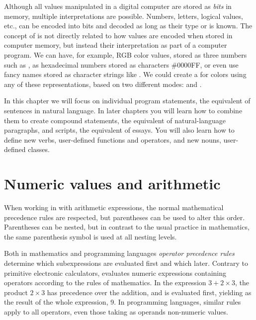\documentclass[krantz2]{krantz}\usepackage{knitr}
\begin{document}
Although all values manipulated in a digital computer are stored as \textit{bits} in memory, multiple interpretations are possible. Numbers, letters, logical values, etc., can be encoded into bits and decoded as long as their type or  is known. The concept of  is not directly related to how values are encoded when stored in computer memory, but instead their interpretation as part of a computer program. We can have, for example, RGB color values, stored as three numbers such as , as hexadecimal numbers stored as characters {\#0000FF}, or even use fancy names stored as character strings like . We could create a  for colors using any of these representations, based on two different modes:  and .

In this chapter we will focus on individual program statements, the equivalent of sentences in natural language. In later chapters you will learn how to combine them to create compound statements, the equivalent of natural-language paragraphs, and scripts, the equivalent of essays. You will also learn how to define new verbs, user-defined functions and operators, and new nouns, user-defined classes.

\section{Numeric values and arithmetic}
\qRoperator{+}\qRoperator{-}\qRoperator{*}\qRoperator{/}
When working in \Rlang with arithmetic expressions, the normal mathematical precedence rules are respected, but parentheses can be used to alter this order. Parentheses can be nested, but in contrast to the usual practice in mathematics, the same parenthesis symbol is used at all nesting levels.

\begin{explainbox}
 Both in mathematics and programming languages \emph{operator precedence rules} determine which subexpressions are evaluated first and which later. Contrary to primitive electronic calculators, \Rlang evaluates numeric expressions containing operators according to the rules of mathematics. In the expression $3 + 2 \times 3$, the product $2 \times 3$ has precedence over the addition, and is evaluated first, yielding as the result of the whole expression, 9. In programming languages, similar rules apply to all operators, even those taking as operands non-numeric values.
\end{explainbox}
\end{document}
